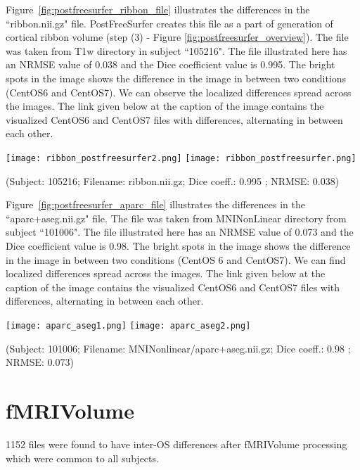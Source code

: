 Figure~\ref{fig:postfreesurfer_ribbon_file} illustrates the differences in the ``ribbon.nii.gz" file. PostFreeSurfer creates this file as a part of generation of cortical ribbon volume (step (3) - Figure \ref{fig:postfreesurfer_overview}). The file was taken from T1w directory in subject ``105216". The file illustrated here has an NRMSE value of 0.038 and the Dice coefficient value is 0.995. The bright spots in the image shows the difference in the image in between two conditions (CentOS6 and CentOS7). We can observe the localized differences spread across the images. The link given below at the caption of the image contains the visualized CentOS6 and CentOS7 files with differences, alternating in between each other.

\begin{center}
\texttt{[image: ribbon\_postfreesurfer2.png]}%
\texttt{[image: ribbon\_postfreesurfer.png]}
\caption*{(Subject: 105216; Filename: ribbon.nii.gz; Dice coeff.: 0.995 ; NRMSE: 0.038)}
\label{fig:postfreesurfer_ribbon_file}
\end{center}

Figure~\ref{fig:postfreesurfer_aparc_file} illustrates the differences in the ``aparc+aseg.nii.gz" file. The file was taken from MNINonLinear directory from subject ``101006". The file illustrated here has an NRMSE value of 0.073 and the Dice coefficient value is 0.98. The bright spots in the image shows the difference in the image in between two conditions (CentOS 6 and CentOS7). We can find localized differences spread across the images. The link given below at the caption of the image contains the visualized CentOS6 and CentOS7 files with differences, alternating in between each other.

\begin{center}
\texttt{[image: aparc\_aseg1.png]}%
\texttt{[image: aparc\_aseg2.png]}%
\caption*{(Subject: 101006; Filename: MNINonlinear/aparc+aseg.nii.gz; Dice coeff.: 0.98 ; NRMSE: 0.073)}
\label{fig:postfreesurfer_aparc_file}
\end{center}

\section{fMRIVolume}\label{sec:fMRI}
1152 files were found to have inter-OS differences after fMRIVolume processing which were common to all subjects.
